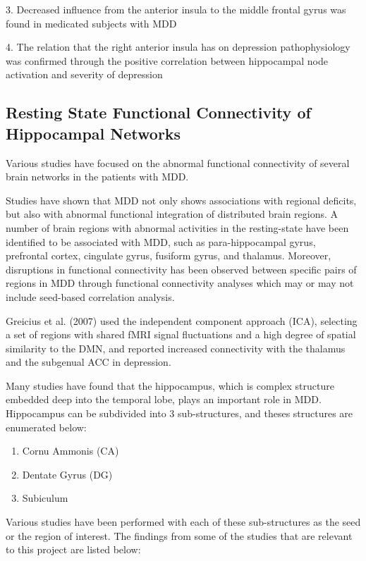 \documentclass{article}
\begin{document}
3. Decreased influence from the anterior insula to the
   middle frontal gyrus was found in medicated subjects with MDD

4. The relation that the right anterior insula has on depression
   pathophysiology was confirmed through the positive correlation
   between hippocampal node activation and severity of depression

\fi


\subsection{Resting State Functional Connectivity of Hippocampal Networks}

Various studies have focused on the abnormal functional connectivity
of several brain networks in the patients with MDD.

Studies have shown that MDD not only shows associations with regional
deficits, but also with abnormal functional integration of distributed
brain regions. A number of brain regions with abnormal activities in
the resting-state have been identified to be associated with MDD, such
as para-hippocampal gyrus, prefrontal cortex, cingulate gyrus,
fusiform gyrus, and thalamus. Moreover, disruptions in functional
connectivity has been observed between specific pairs of regions in
MDD through functional connectivity analyses which may or may not
include seed-based correlation analysis.

Greicius et al. (2007) used the independent component approach (ICA),
selecting a set of regions with shared fMRI signal fluctuations and a
high degree of spatial similarity to the DMN, and reported increased
connectivity with the thalamus and the subgenual ACC in depression.

Many studies have found that the hippocampus, which is complex
structure embedded deep into the temporal lobe, plays an important
role in MDD. Hippocampus can be subdivided into 3 sub-structures, and
theses structures are enumerated below:

\begin{enumerate}[nosep]
    \item Cornu Ammonis (CA)
    \item Dentate Gyrus (DG)
    \item Subiculum
\end{enumerate}

Various studies have been performed with each of these sub-structures
as the seed or the region of interest. The findings from some of the
studies that are relevant to this project are listed below:
\end{document}

